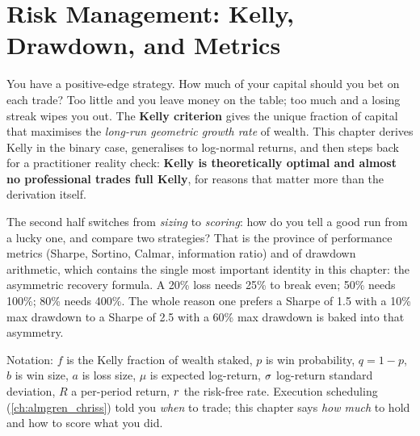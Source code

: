 \chapter{Risk Management: Kelly, Drawdown, and Metrics}
\label{ch:kelly_risk}

You have a positive-edge strategy. How much of your capital should
you bet on each trade? Too little and you leave money on the table;
too much and a losing streak wipes you out. The \textbf{Kelly
criterion} \citep{kelly1956new} gives the unique fraction of
capital that maximises the \emph{long-run geometric growth rate}
of wealth. This chapter derives Kelly in the binary case,
generalises to log-normal returns, and then steps back for a
practitioner reality check: \textbf{Kelly is theoretically optimal
and almost no professional trades full Kelly}, for reasons that
matter more than the derivation itself.

The second half switches from \emph{sizing} to \emph{scoring}: how
do you tell a good run from a lucky one, and compare two
strategies? That is the province of performance metrics (Sharpe,
Sortino, Calmar, information ratio) and of drawdown arithmetic,
which contains the single most important identity in this chapter:
the asymmetric recovery formula. A 20\% loss needs 25\% to break
even; 50\% needs 100\%; 80\% needs 400\%. The whole reason one
prefers a Sharpe of 1.5 with a 10\% max drawdown to a Sharpe of
2.5 with a 60\% max drawdown is baked into that asymmetry.

Notation: $f$ is the Kelly fraction of wealth staked, $p$ is win
probability, $q=1-p$, $b$ is win size, $a$ is loss size, $\mu$ is
expected log-return, $\sigma$ log-return standard deviation, $R$ a
per-period return, $r$ the risk-free rate. Execution scheduling
(\cref{ch:almgren_chriss}) told you \emph{when} to trade; this
chapter says \emph{how much} to hold and how to score what you did.

